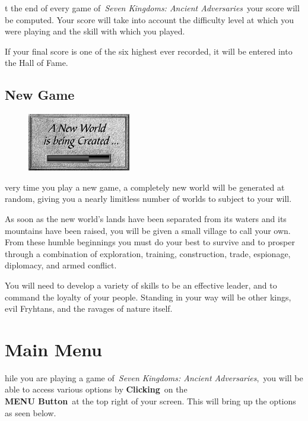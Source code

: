 t the end of every game of \textit{Seven Kingdoms: Ancient Adversaries} your score will be computed. Your score will take into account the difficulty level at which you were playing and the skill with which you played.

If your final score is one of the six highest ever recorded, it will be entered into the Hall of Fame.

\subsection{New Game}

\begin{figure}
	\begin{center}
		\vspace{-20pt}
		\includegraphics[width=0.4\textwidth]{Inewworld}
	\end{center}
\vspace{-20pt}
\end{figure}

very time you play a new game, a completely new world will be generated at random, giving you a nearly limitless number of worlds to subject to your will.

As soon as the new world’s lands have been separated from its waters and its mountains have been raised, you will be given a small village to call your own. From these humble beginnings you must do your best to survive and to prosper through a combination of exploration, training, construction, trade, espionage, diplomacy, and armed conflict.

You will need to develop a variety of skills to be an effective leader, and to command the loyalty of your people. Standing in your way will be other kings, evil Fryhtans, and the ravages of nature itself.

\section{Main Menu}

hile you are playing a game of \textit{Seven Kingdoms: Ancient Adversaries}, you will be able to access various options by \textbf{Clicking} on the \\ %
\textbf{MENU Button} at the top right of your screen. This will bring up the options as seen below.

